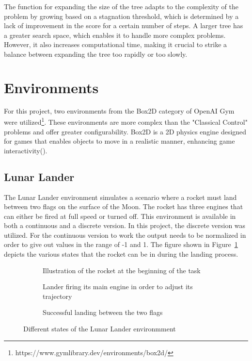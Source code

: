 The function for expanding the size of the tree adapts to the complexity of the problem by growing based on a stagnation threshold, which is determined by a lack of improvement in the score for a certain number of steps. A larger tree has a greater search space, which enables it to handle more complex problems. However, it also increases computational time, making it crucial to strike a balance between expanding the tree too rapidly or too slowly.

\section{Environments}

For this project, two environments from the Box2D category of OpenAI Gym were utilized\footnote{https://www.gymlibrary.dev/environments/box2d/}. These environments are more complex than the "Classical Control" problems and offer greater configurability. Box2D is a 2D physics engine designed for games that enables objects to move in a realistic manner, enhancing game interactivity(\cite{noauthor_box2d_nodate}).

\subsection{Lunar Lander}
The Lunar Lander environment simulates a scenario where a rocket must land between two flags on the surface of the Moon. The rocket has three engines that can either be fired at full speed or turned off. This environment is available in both a continuous and a discrete version. In this project, the discrete version was utilized. For the continuous version to work the output needs to be normalized in order to give out values in the range of -1 and 1. The figure shown in Figure~\ref{fig:lunar_lander} depicts the various states that the rocket can be in during the landing process.

\begin{figure}[!ht]
    \centering
    \begin{subfigure}{.32\textwidth}
        \centering
        \caption{Illustration of the rocket at the beginning of the task}
    \end{subfigure}
    \hspace{1em}
    \begin{subfigure}{.32\textwidth}
        \centering
        \caption{Lander firing its main engine in order to adjust its trajectory}
    \end{subfigure}
    \hspace{1em}
    \begin{subfigure}{.32\textwidth}
        \centering
        \caption{Successful landing between the two flags}
    \end{subfigure}
    \caption{Different states of the Lunar Lander environmment}
    \label{fig:lunar_lander}
\end{figure}

